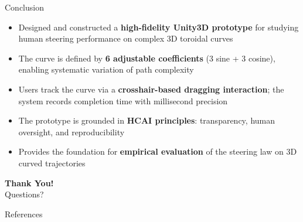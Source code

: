 \documentclass[aspectratio=169, 10pt]{beamer}
\begin{document}
\begin{frame}{Conclusion}
  \begin{itemize}
    \item Designed and constructed a \textbf{high-fidelity Unity3D prototype} for studying
          human steering performance on complex 3D toroidal curves
    \item The curve is defined by \textbf{6 adjustable coefficients} (3 sine + 3 cosine),
          enabling systematic variation of path complexity
    \item Users track the curve via a \textbf{crosshair-based dragging interaction};
          the system records completion time with millisecond precision
    \item The prototype is grounded in \textbf{HCAI principles}: transparency,
          human oversight, and reproducibility
    \item Provides the foundation for \textbf{empirical evaluation} of the steering law
          on 3D curved trajectories
  \end{itemize}

  \vspace{1em}
  \centering
  {\Large\bfseries Thank You!}\\[0.3em]
  Questions?
\end{frame}

\begin{frame}[allowframebreaks]{References}
  \printbibliography[heading=none]
\end{frame}
\end{document}
